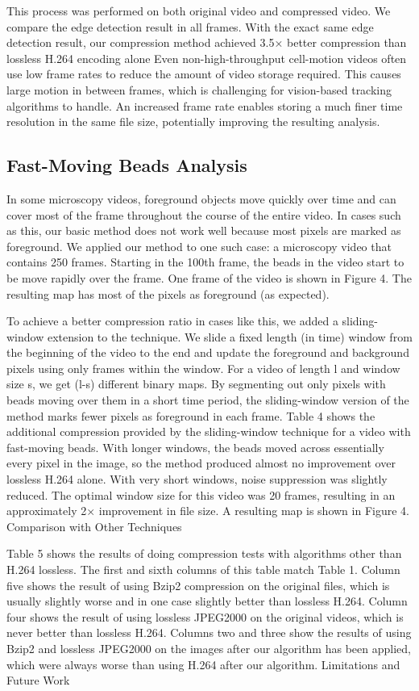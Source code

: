 This process was performed on both original video and compressed video. We compare the edge detection result in all frames. With the exact same edge detection result, our compression method achieved 3.5× better compression than lossless H.264 encoding alone
 Even non-high-throughput cell-motion videos often use low frame rates to reduce the amount of video storage required.  This causes large motion in between frames, which is challenging for vision-based tracking algorithms to handle.  An increased frame rate enables storing a much finer time resolution in the same file size, potentially improving the resulting analysis.

\subsection{Fast-Moving Beads Analysis}
In some microscopy videos, foreground objects move quickly over time and can cover most of the frame throughout the course of the entire video.  In cases such as this, our basic method does not work well because most pixels are marked as foreground.  We applied our method to one such case: a microscopy video that contains 250 frames.  Starting in the 100th frame, the beads in the video start to be move rapidly over the frame.  One frame of the video is shown in Figure 4. The resulting map has most of the pixels as foreground (as expected).

To achieve a better compression ratio in cases like this, we added a sliding-window extension to the technique.  We slide a fixed length (in time) window from the beginning of the video to the end and update the foreground and background pixels using only frames within the window.
For a video of length l and window size s, we get (l-s) different binary maps.  By segmenting out only pixels with beads moving over them in a short time period, the sliding-window version of the method marks fewer pixels as foreground in each frame.
Table 4 shows the additional compression provided by the sliding-window technique for a video with fast-moving beads.  With longer windows, the beads moved across essentially every pixel in the image, so the method produced almost no improvement over lossless H.264 alone.  With very short windows, noise suppression was slightly reduced.  The optimal window size for this video was 20 frames, resulting in an approximately 2× improvement in file size. A resulting map is shown in Figure 4.
Comparison with Other Techniques

Table 5 shows the results of doing compression tests with algorithms other than H.264 lossless.  The first and sixth columns of this table match Table 1.  Column five shows the result of using Bzip2 compression on the original files, which is usually slightly worse and in one case slightly better than lossless H.264.  Column four shows the result of using lossless JPEG2000 on the original videos, which is never better than lossless H.264.  Columns two and three show the results of using Bzip2 and lossless JPEG2000 on the images after our algorithm has been applied, which were always worse than using H.264 after our algorithm.
Limitations and Future Work

